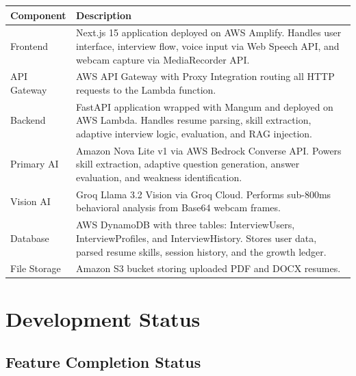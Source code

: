 \documentclass[12pt,a4paper]{article}
\begin{document}
\begin{longtable}{|p{3cm}|p{10cm}|}
\hline
\textbf{Component} & \textbf{Description} \\
\hline
Frontend & Next.js 15 application deployed on AWS Amplify. Handles user interface, interview flow, voice input via Web Speech API, and webcam capture via MediaRecorder API. \\
\hline
API Gateway & AWS API Gateway with Proxy Integration routing all HTTP requests to the Lambda function. \\
\hline
Backend & FastAPI application wrapped with Mangum and deployed on AWS Lambda. Handles resume parsing, skill extraction, adaptive interview logic, evaluation, and RAG injection. \\
\hline
Primary AI & Amazon Nova Lite v1 via AWS Bedrock Converse API. Powers skill extraction, adaptive question generation, answer evaluation, and weakness identification. \\
\hline
Vision AI & Groq Llama 3.2 Vision via Groq Cloud. Performs sub-800ms behavioral analysis from Base64 webcam frames. \\
\hline
Database & AWS DynamoDB with three tables: InterviewUsers, InterviewProfiles, and InterviewHistory. Stores user data, parsed resume skills, session history, and the growth ledger. \\
\hline
File Storage & Amazon S3 bucket storing uploaded PDF and DOCX resumes. \\
\hline
\end{longtable}

\newpage

\section{Development Status}

\subsection{Feature Completion Status}
\end{document}
